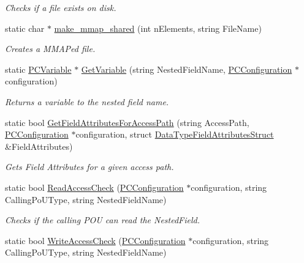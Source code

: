 \begin{DoxyCompactItemize}
\begin{DoxyCompactList}\small\item\em Checks if a file exists on disk. \end{DoxyCompactList}\item 
static char $\ast$ \hyperlink{classpc__emulator_1_1Utils_a12d34b0757d3945a292bf656af1873ab}{make\+\_\+mmap\+\_\+shared} (int n\+Elements, string File\+Name)
\begin{DoxyCompactList}\small\item\em Creates a M\+M\+AP\textquotesingle{}ed file. \end{DoxyCompactList}\item 
static \hyperlink{classpc__emulator_1_1PCVariable}{P\+C\+Variable} $\ast$ \hyperlink{classpc__emulator_1_1Utils_ab00462ed213e71aca03c52abf4e06503}{Get\+Variable} (string Nested\+Field\+Name, \hyperlink{classpc__emulator_1_1PCConfiguration}{P\+C\+Configuration} $\ast$configuration)
\begin{DoxyCompactList}\small\item\em Returns a variable to the nested field name. \end{DoxyCompactList}\item 
static bool \hyperlink{classpc__emulator_1_1Utils_aed87633e02fc22491260d495013c56df}{Get\+Field\+Attributes\+For\+Access\+Path} (string Access\+Path, \hyperlink{classpc__emulator_1_1PCConfiguration}{P\+C\+Configuration} $\ast$configuration, struct \hyperlink{structpc__emulator_1_1DataTypeFieldAttributesStruct}{Data\+Type\+Field\+Attributes\+Struct} \&Field\+Attributes)
\begin{DoxyCompactList}\small\item\em Gets Field Attributes for a given access path. \end{DoxyCompactList}\item 
static bool \hyperlink{classpc__emulator_1_1Utils_a22194d5b8d1dadf8fd795b6a75595fe6}{Read\+Access\+Check} (\hyperlink{classpc__emulator_1_1PCConfiguration}{P\+C\+Configuration} $\ast$configuration, string Calling\+Po\+U\+Type, string Nested\+Field\+Name)
\begin{DoxyCompactList}\small\item\em Checks if the calling P\+OU can read the Nested\+Field. \end{DoxyCompactList}\item 
static bool \hyperlink{classpc__emulator_1_1Utils_a7060cb4142919527d5719f2c1c933f4b}{Write\+Access\+Check} (\hyperlink{classpc__emulator_1_1PCConfiguration}{P\+C\+Configuration} $\ast$configuration, string Calling\+Po\+U\+Type, string Nested\+Field\+Name)

\end{DoxyCompactItemize}
